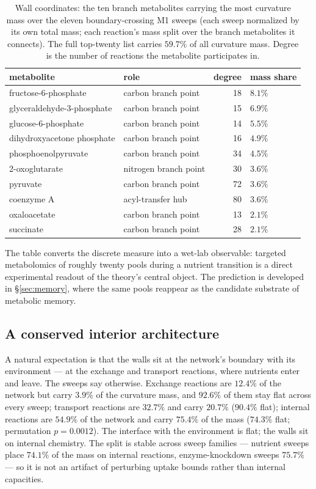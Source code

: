 \begin{table}[t]
\centering
\caption{Wall coordinates: the ten branch metabolites carrying the
most curvature mass over the eleven boundary-crossing M1 sweeps
(each sweep normalized by its own total mass; each reaction's mass
split over the branch metabolites it connects). The full top-twenty
list carries $59.7\%$ of all curvature mass. Degree is the number
of reactions the metabolite participates in.}
\label{tab:walls}
\small
\begin{tabular}{llrl}
\toprule
metabolite & role & degree & mass share \\
\midrule
fructose-6-phosphate & carbon branch point & 18 & $8.1\%$ \\
glyceraldehyde-3-phosphate & carbon branch point & 15 & $6.9\%$ \\
glucose-6-phosphate & carbon branch point & 14 & $5.5\%$ \\
dihydroxyacetone phosphate & carbon branch point & 16 & $4.9\%$ \\
phosphoenolpyruvate & carbon branch point & 34 & $4.5\%$ \\
2-oxoglutarate & nitrogen branch point & 30 & $3.6\%$ \\
pyruvate & carbon branch point & 72 & $3.6\%$ \\
coenzyme A & acyl-transfer hub & 80 & $3.6\%$ \\
oxaloacetate & carbon branch point & 13 & $2.1\%$ \\
succinate & carbon branch point & 28 & $2.1\%$ \\
\bottomrule
\end{tabular}
\end{table}

The table converts the discrete measure into a wet-lab observable:
targeted metabolomics of roughly twenty pools during a nutrient
transition is a direct experimental readout of the theory's
central object. The prediction is developed in
\S\ref{sec:memory}, where the same pools reappear as the candidate
substrate of metabolic memory.

\subsection{A conserved interior architecture}\label{sec:interior}

A natural expectation is that the walls sit at the network's
boundary with its environment --- at the exchange and transport
reactions, where nutrients enter and leave. The sweeps say
otherwise. Exchange reactions are $12.4\%$ of the network but
carry $3.9\%$ of the curvature mass, and $92.6\%$ of them stay
flat across every sweep; transport reactions are $32.7\%$ and
carry $20.7\%$ ($90.4\%$ flat); internal reactions are $54.9\%$ of
the network and carry $75.4\%$ of the mass ($74.3\%$ flat;
permutation $p = 0.0012$). The interface with the environment is
flat; the walls sit on internal chemistry. The split is stable
across sweep families --- nutrient sweeps place $74.1\%$ of the
mass on internal reactions, enzyme-knockdown sweeps $75.7\%$ --- so
it is not an artifact of perturbing uptake bounds rather than
internal capacities.


